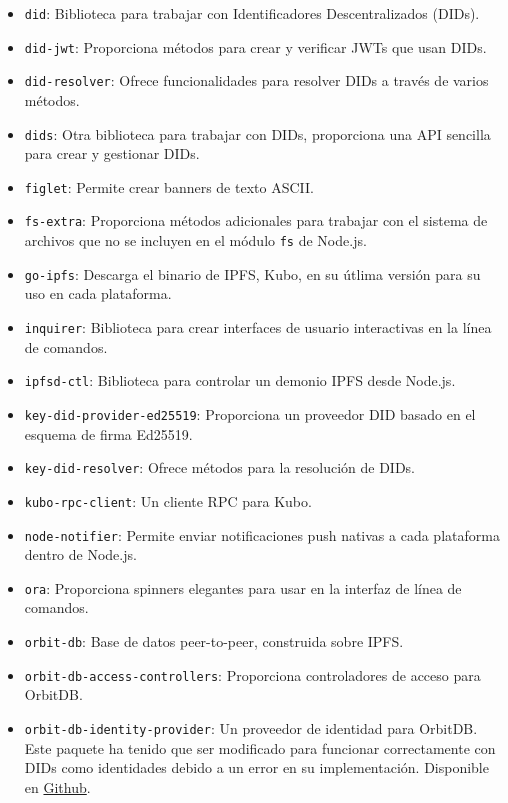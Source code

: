 \begin{itemize}[noitemsep,after=\vspace{-0.4\baselineskip}]
\begin{itemize}[noitemsep]
          \item \texttt{did}: Biblioteca para trabajar con Identificadores Descentralizados (DIDs).
          \item \texttt{did-jwt}: Proporciona métodos para crear y verificar JWTs que usan DIDs.
          \item \texttt{did-resolver}: Ofrece funcionalidades para resolver DIDs a través de varios métodos.
          \item \texttt{dids}: Otra biblioteca para trabajar con DIDs, proporciona una API sencilla para crear y gestionar DIDs.
          \item \texttt{figlet}: Permite crear banners de texto ASCII.
          \item \texttt{fs-extra}: Proporciona métodos adicionales para trabajar con el sistema de archivos que no se incluyen en el módulo \texttt{fs} de Node.js.
          \item \texttt{go-ipfs}: Descarga el binario de IPFS, Kubo, en su útlima versión para su uso en cada plataforma.
          \item \texttt{inquirer}: Biblioteca para crear interfaces de usuario interactivas en la línea de comandos.
          \item \texttt{ipfsd-ctl}: Biblioteca para controlar un demonio IPFS desde Node.js.
          \item \texttt{key-did-provider-ed25519}: Proporciona un proveedor DID basado en el esquema de firma Ed25519.
          \item \texttt{key-did-resolver}: Ofrece métodos para la resolución de DIDs.
          \item \texttt{kubo-rpc-client}: Un cliente RPC para Kubo.
          \item \texttt{node-notifier}: Permite enviar notificaciones push nativas a cada plataforma dentro de Node.js.
          \item \texttt{ora}: Proporciona spinners elegantes para usar en la interfaz de línea de comandos.
          \item \texttt{orbit-db}: Base de datos peer-to-peer, construida sobre IPFS.
          \item \texttt{orbit-db-access-controllers}: Proporciona controladores de acceso para OrbitDB.
          \item \texttt{orbit-db-identity-provider}: Un proveedor de identidad para OrbitDB. Este paquete ha tenido que ser modificado para funcionar correctamente con DIDs como identidades debido a un error en su implementación. Disponible en \href{https://github.com/nicocossiom/orbit-db-identity-provider}{Github}.

\end{itemize}
\end{itemize}
